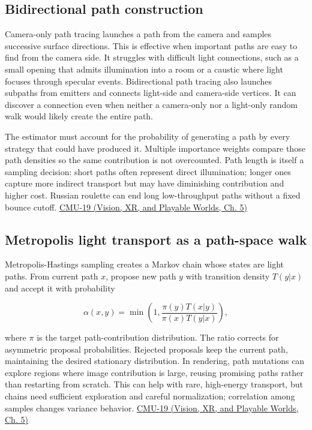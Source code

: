\subsection{Bidirectional path construction}\label{03-visual-computing-i-ch011-bidirectional-path-construction}

\hypertarget{03-visual-computing-i-ch011-bidirectional-path-construction}{}

Camera-only path tracing launches a path from the camera and samples successive surface directions. This is effective when important paths are easy to find from the camera side. It struggles with difficult light connections, such as a small opening that admits illumination into a room or a caustic where light focuses through specular events. Bidirectional path tracing also launches subpaths from emitters and connects light-side and camera-side vertices. It can discover a connection even when neither a camera-only nor a light-only random walk would likely create the entire path.

The estimator must account for the probability of generating a path by every strategy that could have produced it. Multiple importance weights compare those path densities so the same contribution is not overcounted. Path length is itself a sampling decision: short paths often represent direct illumination; longer ones capture more indirect transport but may have diminishing contribution and higher cost. Russian roulette can end long low-throughput paths without a fixed bounce cutoff. \href{../07-Vision-XR-and-Playable-Worlds/main.pdf\#nameddest=04-visual-computing-ii-ch036-cmu-19---variance-reduction}{CMU-19 (Vision, XR, and Playable Worlds, Ch. 5)}

\subsection{Metropolis light transport as a path-space walk}\label{03-visual-computing-i-ch011-metropolis-light-transport-as-a-path-space-walk}

\hypertarget{03-visual-computing-i-ch011-metropolis-light-transport-as-a-path-space-walk}{}

Metropolis-Hastings sampling creates a Markov chain whose states are light paths. From current path \(x\), propose new path \(y\) with transition density \(T(y|x)\) and accept it with probability

\[
\alpha(x,y)=\min\left(1,\frac{\pi(y)T(x|y)}{\pi(x)T(y|x)}\right),
\]

where \(\pi\) is the target path-contribution distribution. The ratio corrects for asymmetric proposal probabilities. Rejected proposals keep the current path, maintaining the desired stationary distribution. In rendering, path mutations can explore regions where image contribution is large, reusing promising paths rather than restarting from scratch. This can help with rare, high-energy transport, but chains need sufficient exploration and careful normalization; correlation among samples changes variance behavior. \href{../07-Vision-XR-and-Playable-Worlds/main.pdf\#nameddest=04-visual-computing-ii-ch036-cmu-19---variance-reduction}{CMU-19 (Vision, XR, and Playable Worlds, Ch. 5)}

